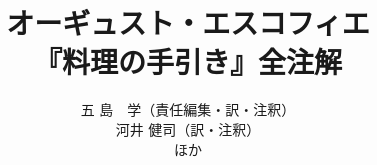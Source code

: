 %
%
%


\title{\Large{オーギュスト・エスコフィエ}\\\LARGE{『料理の手引き』全注解}}
\author{\large{五 島　学（責任編集・訳・注釈）\\河井 健司（訳・注釈）\\ほか}}






\maketitle
%
%


\newpage
\thispagestyle{empty}
\newpage
\newpage
\thispagestyle{empty}
\newpage




%
% 
%
%
%

\frontmatter





\mainmatter


%



%

% 





%

